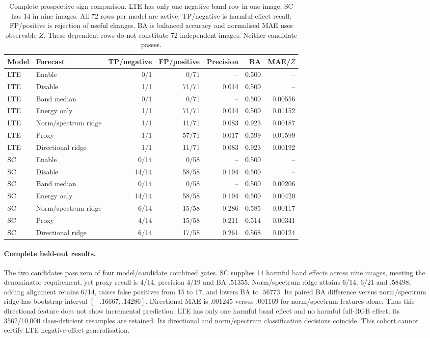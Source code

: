\begin{table}[t]\centering\small
\caption{Complete prospective sign comparison. LTE has only one negative band row in one image; SC has 14 in nine images. All 72 rows per model are active. TP/negative is harmful-effect recall; FP/positive is rejection of useful changes. BA is balanced accuracy and normalised MAE uses observable $Z$. These dependent rows do not constitute 72 independent images. Neither candidate passes.}\label{tab:negative-sign}
\begin{tabular}{llrrrrr}\toprule
Model & Forecast & TP/negative & FP/positive & Precision & BA & MAE/$Z$\\\midrule
LTE & Enable & 0/1 & 0/71 & -- & 0.500 & -- \\
LTE & Disable & 1/1 & 71/71 & 0.014 & 0.500 & -- \\
LTE & Band median & 0/1 & 0/71 & -- & 0.500 & 0.00556 \\
LTE & Energy only & 1/1 & 71/71 & 0.014 & 0.500 & 0.01152 \\
LTE & Norm/spectrum ridge & 1/1 & 11/71 & 0.083 & 0.923 & 0.00187 \\
LTE & Proxy & 1/1 & 57/71 & 0.017 & 0.599 & 0.01599 \\
LTE & Directional ridge & 1/1 & 11/71 & 0.083 & 0.923 & 0.00192 \\
SC & Enable & 0/14 & 0/58 & -- & 0.500 & -- \\
SC & Disable & 14/14 & 58/58 & 0.194 & 0.500 & -- \\
SC & Band median & 0/14 & 0/58 & -- & 0.500 & 0.00206 \\
SC & Energy only & 14/14 & 58/58 & 0.194 & 0.500 & 0.00420 \\
SC & Norm/spectrum ridge & 6/14 & 15/58 & 0.286 & 0.585 & 0.00117 \\
SC & Proxy & 4/14 & 15/58 & 0.211 & 0.514 & 0.00341 \\
SC & Directional ridge & 6/14 & 17/58 & 0.261 & 0.568 & 0.00124 \\
\bottomrule\end{tabular}\end{table}

\paragraph{Complete held-out results.}
The two candidates pass zero of four model/candidate combined gates. SC supplies 14 harmful band effects across nine images, meeting the denominator requirement, yet proxy recall is 4/14, precision 4/19 and BA $.51355$. Norm/spectrum ridge attains 6/14, 6/21 and $.58498$; adding alignment retains 6/14, raises false positives from 15 to 17, and lowers BA to $.56773$. Its paired BA difference versus norm/spectrum ridge has bootstrap interval $[-.16667,.14286]$. Directional MAE is $.001245$ versus $.001169$ for norm/spectrum features alone. Thus this directional feature does not show incremental prediction. LTE has only one harmful band effect and no harmful full-RGB effect; its 3562/10,000 class-deficient resamples are retained. Its directional and norm/spectrum classification decisions coincide. This cohort cannot certify LTE negative-effect generalisation.

